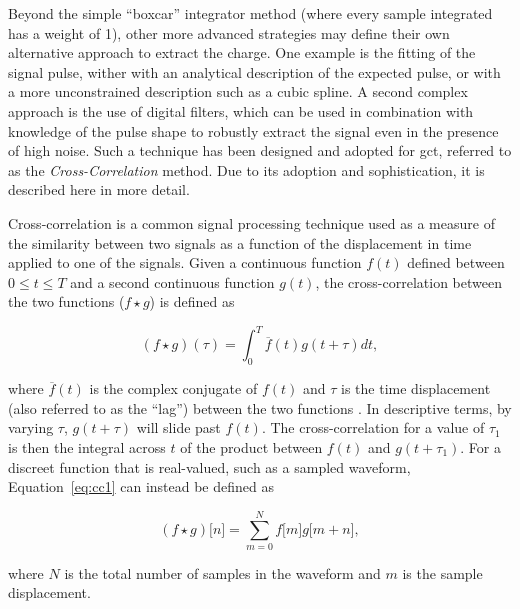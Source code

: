 Beyond the simple ``boxcar'' integrator method (where every sample integrated has a weight of 1), other more advanced strategies may define their own alternative approach to extract the charge. One example is the fitting of the signal pulse, wither with an analytical description of the expected pulse, or with a more unconstrained description such as a cubic spline. A second complex approach is the use of digital filters, which can be used in combination with knowledge of the pulse shape to robustly extract the signal even in the presence of high noise. Such a technique has been designed and adopted for \gls{gct}, referred to as the \textit{Cross-Correlation} method. Due to its adoption and sophistication, it is described here in more detail. 

Cross-correlation is a common signal processing technique used as a measure of the similarity between two signals as a function of the displacement in time applied to one of the signals. Given a continuous function $f(t)$ defined between $0 \le t \le T$ and a second continuous function $g(t)$, the cross-correlation between the two functions ($f \star g$) is defined as 

\begin{equation} \label{eq:cc1}
(f \star g)(\tau) = \int_0^T \overline{f}(t)g(t + \tau)dt,
\end{equation}

where $\overline{f}(t)$ is the complex conjugate of $f(t)$ and $\tau$ is the time displacement (also referred to as the ``lag'') between the two functions \cite{wolfram-crosscorrelate}. In descriptive terms, by varying $\tau$, $g(t + \tau)$ will slide past $f(t)$. The cross-correlation for a value of $\tau_1$ is then the integral across $t$ of the product between $f(t)$ and $g(t + \tau_1)$. For a discreet function that is real-valued, such as a sampled waveform, Equation~\ref{eq:cc1} can instead be defined as

\begin{equation} \label{eq:cc2}
(f \star g)\lbrack n \rbrack = \sum_{m=0}^N f\lbrack m \rbrack g\lbrack m + n\rbrack,
\end{equation}

where $N$ is the total number of samples in the waveform and $m$ is the sample displacement. 

